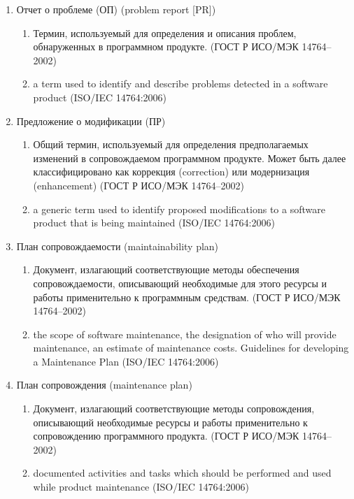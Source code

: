 \begin{enumerate}
    \item Отчет о проблеме (ОП) (problem report [PR])
    \begin{enumerate}
        \item Термин, используемый для определения и описания проблем, обнаруженных в программном продукте.
        (ГОСТ Р ИСО/МЭК 14764--2002)
        \item a term used to identify and describe problems detected in a software product
        (ISO/IEC 14764:2006)
    \end{enumerate}

    \item Предложение о модификации (ПР)
    \begin{enumerate}
        \item Общий термин, используемый для определения предполагаемых изменений в сопровождаемом программном продукте.
        Может быть далее классифицировано как коррекция (correction) или модернизация (enhancement)
        (ГОСТ Р ИСО/МЭК 14764--2002)
        \item a generic term used to identify proposed modifications to a software product that is being maintained
        (ISO/IEC 14764:2006)
    \end{enumerate}

    \item План сопровождаемости (maintainability plan)
    \begin{enumerate}
        \item Документ, излагающий соответствующие методы обеспечения сопровождаемости, описывающий необходимые для этого ресурсы и работы применительно к программным средствам.
        (ГОСТ Р ИСО/МЭК 14764--2002)
        \item the scope of software maintenance, the designation of who will provide maintenance, an estimate of maintenance costs.
        Guidelines for developing a Maintenance Plan
        (ISO/IEC 14764:2006)
    \end{enumerate}

    \item План сопровождения (maintenance plan)
    \begin{enumerate}
        \item Документ, излагающий соответствующие методы сопровождения, описывающий необходимые ресурсы и работы применительно к сопровождению программного продукта.
        (ГОСТ Р ИСО/МЭК 14764--2002)
        \item documented activities and tasks which should be performed and used while product maintenance
        (ISO/IEC 14764:2006)
    \end{enumerate}


\end{enumerate}
